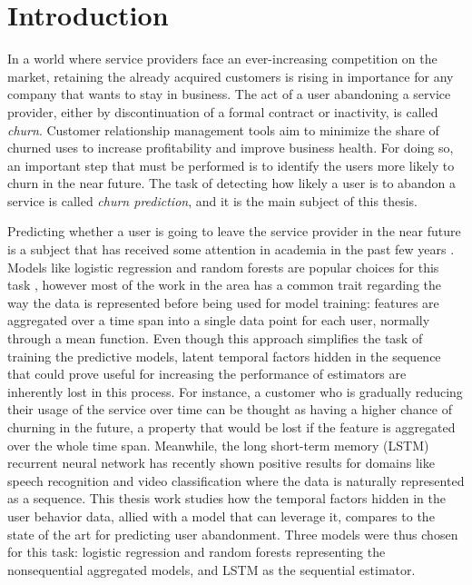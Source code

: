 \documentclass{kththesis}
\begin{document}
\clearpage

\cleardoublepage

\tableofcontents

\listoffigures
 
\listoftables


\mainmatter


\chapter{Introduction}

		In a world where service providers face an ever-increasing competition on the market, retaining the already acquired customers is rising in importance for any company that wants to stay in business. The act of a user abandoning a service provider, either by discontinuation of a formal contract or inactivity, is called \emph{churn}. Customer relationship management tools aim to minimize the share of churned uses to increase profitability and improve business health. For doing so, an important step that must be performed is to identify the users more likely to churn in the near future. The task of detecting how likely a user is to abandon a service is called \emph{churn prediction}, and it is the main subject of this thesis.
	
	Predicting whether a user is going to leave the service provider in the near future is a subject that has received some attention in academia in the past few years \citep{Pudipeddi2014}\citep{GurAli2014}\citep{Drachen2016RapidPO}. Models like logistic regression and random forests are popular choices for this task \citep{mahajan2015review}, however most of the work in the area has a common trait regarding the way the data is represented before being used for model training: features are aggregated over a time span into a single data point for each user, normally through a mean function. Even though this approach simplifies the task of training the predictive models, latent temporal factors hidden in the sequence that could prove useful for increasing the performance of estimators are inherently lost in this process. For instance, a customer who is gradually reducing their usage of the service over time can be thought as having a higher chance of churning in the future, a property that would be lost if the feature is aggregated over the whole time span. Meanwhile, the long short-term memory (LSTM) recurrent neural network has recently shown positive results for domains like speech recognition \citep{graves2013speech} and video classification \citep{yue2015beyond} where the data is naturally represented as a sequence. This thesis work studies how the temporal factors hidden in the user behavior data, allied with a model that can leverage it, compares to the state of the art for predicting user abandonment. Three models were thus chosen for this task: logistic regression and random forests representing the nonsequential aggregated models, and LSTM as the sequential estimator.	
	
\end{document}
